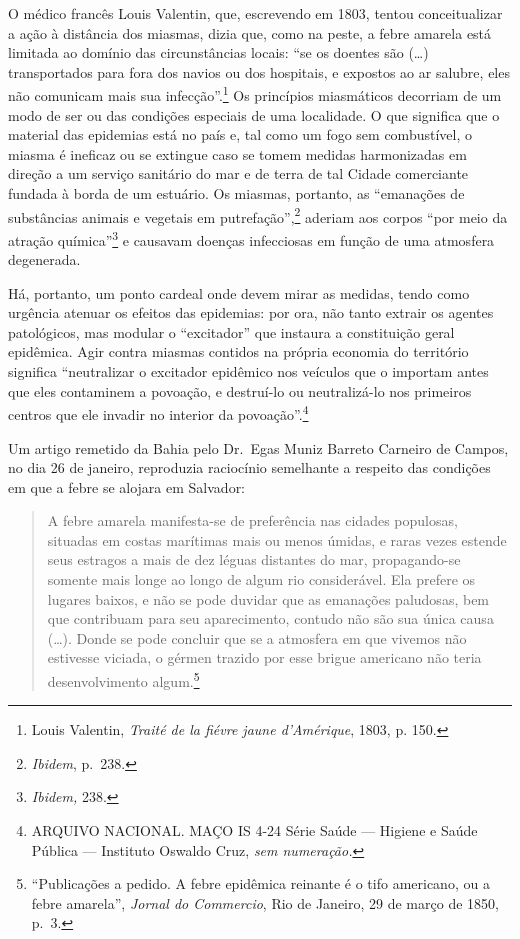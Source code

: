 O médico francês Louis Valentin, que, escrevendo em 1803, tentou
conceitualizar a ação à distância dos miasmas, dizia que, como na peste,
a febre amarela está limitada ao domínio das circunstâncias locais: ``se
os doentes são (\ldots{}) transportados para fora dos navios ou dos
hospitais, e expostos ao ar salubre, eles não comunicam mais sua
infecção''.\footnote{Louis Valentin, \textit{Traité de la fiévre jaune
  d'Amérique}, 1803, p. 150.} Os princípios miasmáticos decorriam de um
modo de ser ou das condições especiais de uma localidade. O que
significa que o material das epidemias está no país e, tal como um fogo
sem combustível, o miasma é ineficaz ou se extingue caso se tomem
medidas harmonizadas em direção a um serviço sanitário do mar e de terra
de tal Cidade comerciante fundada à borda de um estuário. Os miasmas,
portanto, as ``emanações de substâncias animais e vegetais em
putrefação'',\footnote{\textit{Ibidem}, p.~238.} aderiam aos corpos ``por
meio da atração química''\footnote{\textit{Ibidem,} 238.} e causavam
doenças infecciosas em função de uma atmosfera degenerada.

Há, portanto, um ponto cardeal onde devem mirar as medidas, tendo como
urgência atenuar os efeitos das epidemias: por ora, não tanto extrair os
agentes patológicos, mas modular o ``excitador'' que instaura a
constituição geral epidêmica. Agir contra miasmas contidos na própria
economia do território significa ``neutralizar o excitador epidêmico nos
veículos que o importam antes que eles contaminem a povoação, e
destruí-lo ou neutralizá-lo nos primeiros centros que ele invadir no
interior da povoação''.\footnote{ARQUIVO NACIONAL. MAÇO IS 4-24 Série
  Saúde --- Higiene e Saúde Pública --- Instituto Oswaldo Cruz, \textit{sem
  numeração.}}

Um artigo remetido da Bahia pelo Dr.~Egas Muniz Barreto Carneiro de
Campos, no dia 26 de janeiro, reproduzia raciocínio semelhante a
respeito das condições em que a febre se alojara em Salvador:

\begin{quote}
A febre amarela manifesta-se de preferência nas cidades populosas,
situadas em costas marítimas mais ou menos úmidas, e raras vezes estende
seus estragos a mais de dez léguas distantes do mar, propagando-se
somente mais longe ao longo de algum rio considerável. Ela prefere os
lugares baixos, e não se pode duvidar que as emanações paludosas, bem
que contribuam para seu aparecimento, contudo não são sua única causa
(\dots{}). Donde se pode concluir que se a atmosfera em que vivemos não
estivesse viciada, o gérmen trazido por esse brigue americano não teria
desenvolvimento algum.\footnote{``Publicações a pedido. A febre
  epidêmica reinante é o tifo americano, ou a febre amarela'',
  \textit{Jornal do Commercio}, Rio de Janeiro, 29 de março de 1850, p.~3.}
\end{quote}


